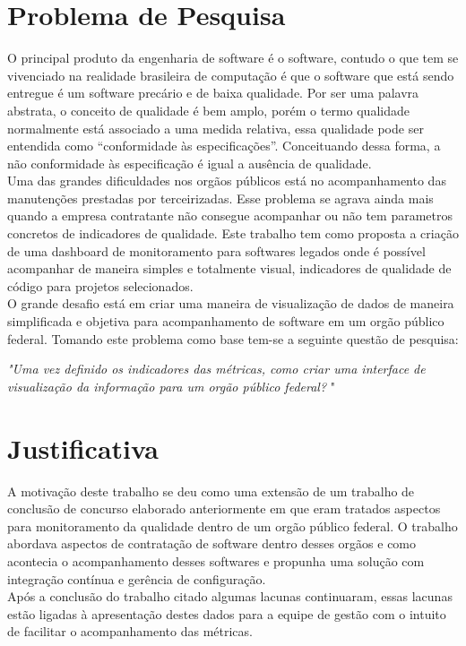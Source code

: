 \section{Problema de Pesquisa}
	O principal produto da engenharia de software é o software, contudo o que tem se vivenciado na realidade brasileira de computação é que o software que está sendo entregue é um software precário e de baixa qualidade. Por ser uma palavra abstrata, o conceito de qualidade é bem amplo, porém o termo qualidade normalmente está associado a uma medida relativa, essa qualidade pode ser entendida como “conformidade às especificações”. Conceituando dessa forma, a não conformidade às especificação é igual a ausência de qualidade.
	\\Uma das grandes dificuldades nos orgãos públicos está no acompanhamento das manutenções prestadas por terceirizadas. Esse problema se agrava ainda mais quando a empresa contratante não consegue acompanhar ou não tem parametros concretos de indicadores de qualidade. Este trabalho tem como proposta a criação de uma dashboard de monitoramento para softwares legados onde é possível acompanhar de maneira simples e totalmente visual, indicadores de qualidade de código para projetos selecionados.
	\\O grande desafio está em criar uma maneira de visualização de dados de maneira simplificada e objetiva para acompanhamento de software em um orgão público federal. Tomando este problema como base tem-se a seguinte questão de pesquisa:
	
	\begin{center}
	\textit{"Uma vez definido os indicadores das métricas, como criar uma interface de visualização da informação para um orgão público federal? }"	
	\end{center}
	
\section{Justificativa}
	A motivação deste trabalho se deu como uma extensão de um trabalho de conclusão de concurso elaborado anteriormente em que eram tratados aspectos para monitoramento da qualidade dentro de um orgão público federal. O trabalho abordava aspectos de contratação de software dentro desses orgãos e como acontecia o acompanhamento desses softwares e propunha uma solução com integração contínua e gerência de configuração.
	\\Após a conclusão do trabalho citado algumas lacunas continuaram, essas lacunas estão ligadas à apresentação destes dados para a equipe de gestão com o intuito de facilitar o acompanhamento das métricas.


